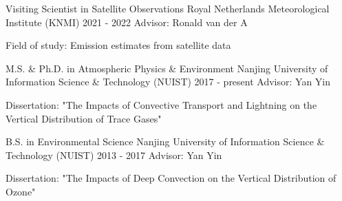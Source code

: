 

\begin{cventries}

  \cventry
    {Visiting Scientist in Satellite Observations} %
    {Royal Netherlands Meteorological Institute (KNMI)} %
    {2021 - 2022} %
    {Advisor: Ronald van der A} %
    {
      \begin{cvitems} %
        \item {Field of study: Emission estimates from satellite data}
      \end{cvitems}
    }

  \cventry
    {M.S. \& Ph.D. in Atmospheric Physics \& Environment} %
    {Nanjing University of Information Science \& Technology (NUIST)} %
    {2017 - present} %
    {Advisor: Yan Yin} %
    {
      \begin{cvitems} %
        \item {Dissertation: "The Impacts of Convective Transport and Lightning on the Vertical Distribution of Trace Gases"}
      \end{cvitems}
    }

  \cventry
    {B.S. in Environmental Science} %
    {Nanjing University of Information Science \& Technology (NUIST)} %
    {2013 - 2017} %
    {Advisor: Yan Yin} %
    {
      \begin{cvitems} %
        \item {Dissertation: "The Impacts of Deep Convection on the Vertical Distribution of Ozone"}
      \end{cvitems}
    }


\end{cventries}
